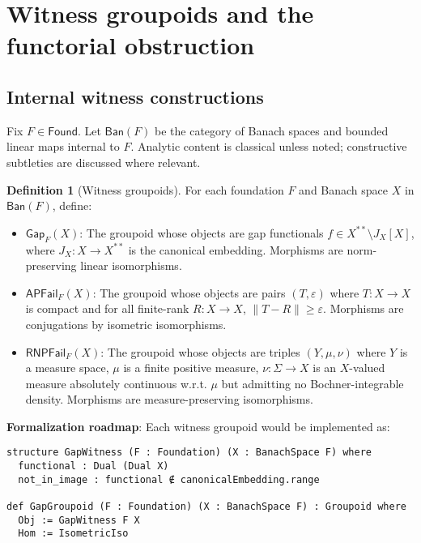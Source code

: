 \documentclass[11pt]{article}
\theoremstyle{definition}
\newtheorem{definition}[theorem]{Definition}
\theoremstyle{remark}
\newcommand{\Found}{\mathsf{Found}}
\newcommand{\Ban}{\mathsf{Ban}}
\begin{document}
\section{Witness groupoids and the functorial obstruction}\label{sec:obstruction}

\subsection{Internal witness constructions}\label{ssec:witness}

Fix \(F\in\Found\). Let \(\Ban(F)\) be the category of Banach spaces and bounded linear maps internal to \(F\). Analytic content is classical unless noted; constructive subtleties are discussed where relevant.

\begin{definition}[Witness groupoids]\label{def:witness-groupoids}
For each foundation \(F\) and Banach space \(X\) in \(\Ban(F)\), define:
\begin{itemize}[leftmargin=1.6em]
\item \(\mathsf{Gap}_F(X)\): The groupoid whose objects are gap functionals \(f \in X^{**} \setminus J_X[X]\), where \(J_X: X \to X^{**}\) is the canonical embedding. Morphisms are norm-preserving linear isomorphisms.

\item \(\mathsf{AP\!Fail}_F(X)\): The groupoid whose objects are pairs \((T, \varepsilon)\) where \(T: X \to X\) is compact and for all finite-rank \(R: X \to X\), \(\|T - R\| \geq \varepsilon\). Morphisms are conjugations by isometric isomorphisms.

\item \(\mathsf{RNP\!Fail}_F(X)\): The groupoid whose objects are triples \((Y, \mu, \nu)\) where \(Y\) is a measure space, \(\mu\) is a finite positive measure, \(\nu: \Sigma \to X\) is an \(X\)-valued measure absolutely continuous w.r.t. \(\mu\) but admitting no Bochner-integrable density. Morphisms are measure-preserving isomorphisms.
\end{itemize}
\end{definition}

\begin{mdframed}[style=roadmap]
\textbf{Formalization roadmap}: Each witness groupoid would be implemented as:
\begin{verbatim}
structure GapWitness (F : Foundation) (X : BanachSpace F) where
  functional : Dual (Dual X)
  not_in_image : functional ∉ canonicalEmbedding.range

def GapGroupoid (F : Foundation) (X : BanachSpace F) : Groupoid where
  Obj := GapWitness F X
  Hom := IsometricIso
\end{verbatim}
\end{mdframed}
\end{document}
